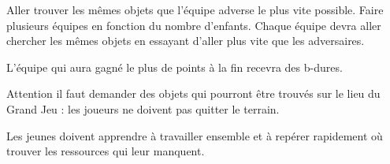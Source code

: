 \documentclass{grand-jeu}
\begin{document}
\begin{regles}

Aller trouver les mêmes objets que l'équipe adverse le plus vite possible. Faire plusieurs équipes en fonction du nombre d'enfants. Chaque équipe devra aller chercher les mêmes objets en essayant d'aller plus vite que les adversaires.

L’équipe qui aura gagné le plus de points à la fin recevra des b-dures.

Attention il faut demander des objets qui pourront être trouvés sur le lieu du Grand Jeu : les joueurs ne doivent pas quitter le terrain. 

\end{regles}

\begin{imaginaire}
Les jeunes doivent apprendre à travailler ensemble et à repérer rapidement où trouver les ressources qui leur manquent. 
\end{imaginaire}

\begin{moments-stop}
\end{moments-stop}
\end{document}
